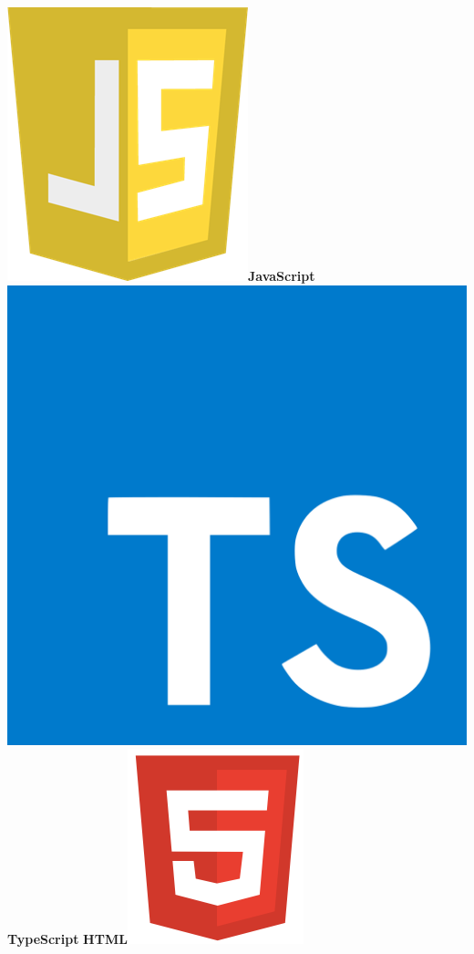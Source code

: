 \documentclass[a4paper]{friggeri-cv}
\begin{document}
\begin{aside}
        \includegraphics[scale=0.037]{../assets/images/icons/JavaScript_icon.png}\textbf{JavaScript}
        \includegraphics[scale=0.0085]{../assets/images/logos/TypeScript_logo.png}\textbf{TypeScript}
        \textbf{HTML}\includegraphics[scale=0.05]{../assets/images/icons/HTML_icon.png}

\end{aside}
\end{document}
